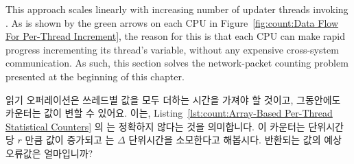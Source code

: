 This approach scales linearly with increasing number of updater threads
invoking .
As is shown by the green arrows on each CPU in
Figure~\ref{fig:count:Data Flow For Per-Thread Increment},
the reason for this is that each CPU can make rapid progress incrementing
its thread's variable, without any expensive cross-system communication.
As such, this section solves the network-packet counting problem presented
at the beginning of this chapter.
\fi

\QuickQuiz{}
	읽기 오퍼레이션은 쓰레드별 값을 모두 더하는 시간을 가져야 할 것이고,
	그동안에도 카운터는 값이 변할 수 있어요.
	이는,
	Listing~\ref{lst:count:Array-Based Per-Thread Statistical Counters}
	의   는 정확하지 않다는 것을 의미합니다.
	이 카운터는 단위시간당 $r$ 만큼 값이 증가되고  는
	$\Delta$ 단위시간을 소모한다고 해봅시다.
	반환되는 값의 예상 오류값은 얼마입니까?
	\iffalse

